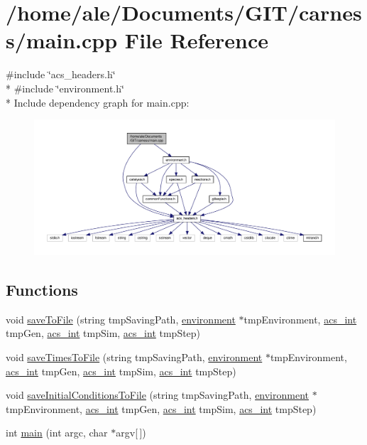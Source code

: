 \hypertarget{a00083}{\section{/home/ale/\-Documents/\-G\-I\-T/carness/main.cpp File Reference}
\label{a00083}
}
{\ttfamily \#include \char`\"{}acs\-\_\-headers.\-h\char`\"{}}\\*
{\ttfamily \#include \char`\"{}environment.\-h\char`\"{}}\\*
Include dependency graph for main.\-cpp\-:\nopagebreak
\begin{figure}[H]
\begin{center}
\leavevmode
\includegraphics[width=350pt]{a00132}
\end{center}
\end{figure}
\subsection*{Functions}
\begin{DoxyCompactItemize}
\item 
void \hyperlink{a00083_acac21f7e718db9d00451e3caaaacc25f}{save\-To\-File} (string tmp\-Saving\-Path, \hyperlink{a00008}{environment} $\ast$tmp\-Environment, \hyperlink{a00066_a8d277355641a098190360234e2ebde35}{acs\-\_\-int} tmp\-Gen, \hyperlink{a00066_a8d277355641a098190360234e2ebde35}{acs\-\_\-int} tmp\-Sim, \hyperlink{a00066_a8d277355641a098190360234e2ebde35}{acs\-\_\-int} tmp\-Step)
\item 
void \hyperlink{a00083_a2bf310904bc4e1fb5669e548525c4ba7}{save\-Times\-To\-File} (string tmp\-Saving\-Path, \hyperlink{a00008}{environment} $\ast$tmp\-Environment, \hyperlink{a00066_a8d277355641a098190360234e2ebde35}{acs\-\_\-int} tmp\-Gen, \hyperlink{a00066_a8d277355641a098190360234e2ebde35}{acs\-\_\-int} tmp\-Sim, \hyperlink{a00066_a8d277355641a098190360234e2ebde35}{acs\-\_\-int} tmp\-Step)
\item 
void \hyperlink{a00083_a4665c5f33b43dfc8fae4757552028cc0}{save\-Initial\-Conditions\-To\-File} (string tmp\-Saving\-Path, \hyperlink{a00008}{environment} $\ast$tmp\-Environment, \hyperlink{a00066_a8d277355641a098190360234e2ebde35}{acs\-\_\-int} tmp\-Gen, \hyperlink{a00066_a8d277355641a098190360234e2ebde35}{acs\-\_\-int} tmp\-Sim, \hyperlink{a00066_a8d277355641a098190360234e2ebde35}{acs\-\_\-int} tmp\-Step)
\item 
int \hyperlink{a00083_a0ddf1224851353fc92bfbff6f499fa97}{main} (int argc, char $\ast$argv\mbox{[}$\,$\mbox{]})
\end{DoxyCompactItemize}


